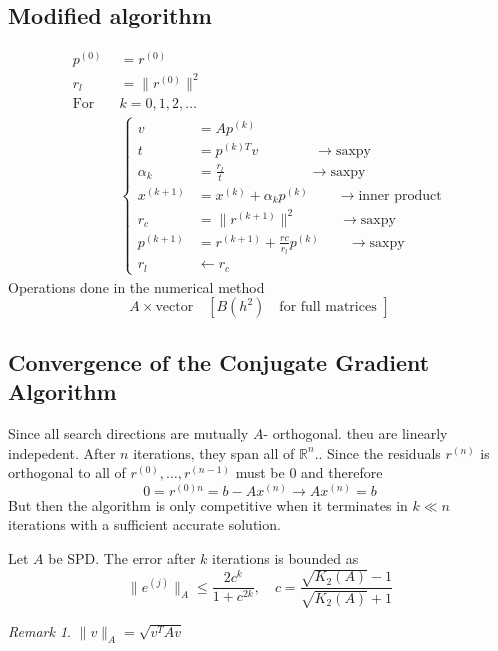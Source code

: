 \documentclass{article}
\theoremstyle{remark}
\newtheorem*{remark}{Remark}
\begin{document}
\subsection{Modified algorithm}%
\label{sub:modified_algorithm}
\[
  \begin{split}
p^{(0)} &=   r^{(0)}  \\
r_{l} &=   \| r^{(0)}\|^2 \\
\text{For} \quad    &  k = 0,1,2,\ldots \\
 & 
\begin{cases}
v&= Ap^{(k)}  \\
t &=  p^{(k)T }  v \quad \quad  \quad \quad      \to  \text{saxpy}  \\
\alpha _{k} &=  \frac{r_{l}}{t} \quad \quad \quad \quad \quad \quad       \to  \text{saxpy}    \\
x^{(k+1)} &=  x^{(k)} + \alpha _{k} p^{(k)} \quad \quad \to  \text{inner product}   \\
r_c &=  \| r^{(k+1)}\| ^2  \quad \quad \quad    \to   \text{saxpy} \\
p^{(k+1)} &=  r^{(k+1)} + \frac{rc}{r_{l}}    p^{(k)} \quad \quad    \to  \text{saxpy}  \\
r_{l}   &  \leftarrow r_{c}
\end{cases}
  \end{split} 
\] 
Operations done in the numerical method \[
A \times  \text{vector} \quad  \left[ B\left( h^2 \right) \quad \text{for full matrices }  \right]  
\] 

\subsection{Convergence of the Conjugate Gradient Algorithm}%
\label{sub:convergence_of_the_conjugate_gradient_algorithm}

Since all search directions are mutually $A$- orthogonal. theu are linearly indepedent. After $n$ iterations, they span all of $\mathbb{R} ^{n}$.. Since the residuals $r^{(n)} $ is orthogonal to all of $r^{(0)} , \ldots, r^{(n-1)}$ must be $0$ and therefore \[
0 = r^{(0)n} = b - Ax^{(n)} \to  Ax^{(n)} = b 
\] 
But then the algorithm is only competitive when it terminates in $k \ll n$ iterations with a sufficient accurate solution.

\begin{theorem}
  Let $A$ be SPD. The error after $k$ iterations is bounded as \[
  \|e^{(j)}\|_{A } \le \frac{2c^{k}}{1+ c^{2k}} , \quad c = \frac{\sqrt{K_{2}\left( A \right)} - 1}{ \sqrt{K_{2}\left( A \right)}  +1}  
  \] 
\end{theorem}
\begin{remark}
  $\|v\|_{A} = \sqrt{ v^{T} A v} $
\end{remark}
\end{document}
